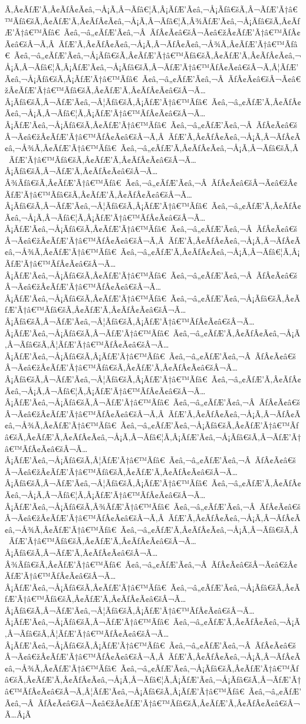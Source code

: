 \documentclass{article}
\begin{document}
\begin{outline}[enumerate]
Ã‚Â¢ÃƒÆ’Ã‚Â¢ÃƒÂ¢Ã¢â‚¬Å¡Ã‚Â¬Ãƒâ€¦Ã‚Â¡ÃƒÆ’Ã¢â‚¬Å¡Ãƒâ€šÃ‚Â¬ÃƒÆ’Ã†â€™Ãƒâ€šÃ‚Â¢ÃƒÆ’Ã‚Â¢ÃƒÂ¢Ã¢â‚¬Å¡Ã‚Â¬Ãƒâ€¦Ã‚Â¾ÃƒÆ’Ã¢â‚¬Å¡Ãƒâ€šÃ‚Â¢ÃƒÆ’Ã†â€™Ãƒâ€ Ã¢â‚¬â„¢ÃƒÆ’Ã¢â‚¬Â ÃƒÂ¢Ã¢â€šÂ¬Ã¢â€žÂ¢ÃƒÆ’Ã†â€™ÃƒÂ¢Ã¢â€šÂ¬Ã‚Â ÃƒÆ’Ã‚Â¢ÃƒÂ¢Ã¢â‚¬Å¡Ã‚Â¬ÃƒÂ¢Ã¢â‚¬Å¾Ã‚Â¢ÃƒÆ’Ã†â€™Ãƒâ€ Ã¢â‚¬â„¢ÃƒÆ’Ã¢â‚¬Å¡Ãƒâ€šÃ‚Â¢ÃƒÆ’Ã†â€™Ãƒâ€šÃ‚Â¢ÃƒÆ’Ã‚Â¢ÃƒÂ¢Ã¢â‚¬Å¡Ã‚Â¬Ãƒâ€¦Ã‚Â¡ÃƒÆ’Ã¢â‚¬Å¡Ãƒâ€šÃ‚Â¬ÃƒÆ’Ã†â€™ÃƒÂ¢Ã¢â€šÂ¬Ã‚Â¦ÃƒÆ’Ã¢â‚¬Å¡Ãƒâ€šÃ‚Â¡ÃƒÆ’Ã†â€™Ãƒâ€ Ã¢â‚¬â„¢ÃƒÆ’Ã¢â‚¬Â ÃƒÂ¢Ã¢â€šÂ¬Ã¢â€žÂ¢ÃƒÆ’Ã†â€™Ãƒâ€šÃ‚Â¢ÃƒÆ’Ã‚Â¢ÃƒÂ¢Ã¢â€šÂ¬Ã…Â¡Ãƒâ€šÃ‚Â¬ÃƒÆ’Ã¢â‚¬Â¦Ãƒâ€šÃ‚Â¡ÃƒÆ’Ã†â€™Ãƒâ€ Ã¢â‚¬â„¢ÃƒÆ’Ã‚Â¢ÃƒÂ¢Ã¢â‚¬Å¡Ã‚Â¬Ãƒâ€¦Ã‚Â¡ÃƒÆ’Ã†â€™ÃƒÂ¢Ã¢â€šÂ¬Ã…Â¡ÃƒÆ’Ã¢â‚¬Å¡Ãƒâ€šÃ‚Â¢ÃƒÆ’Ã†â€™Ãƒâ€ Ã¢â‚¬â„¢ÃƒÆ’Ã¢â‚¬Â ÃƒÂ¢Ã¢â€šÂ¬Ã¢â€žÂ¢ÃƒÆ’Ã†â€™ÃƒÂ¢Ã¢â€šÂ¬Ã‚Â ÃƒÆ’Ã‚Â¢ÃƒÂ¢Ã¢â‚¬Å¡Ã‚Â¬ÃƒÂ¢Ã¢â‚¬Å¾Ã‚Â¢ÃƒÆ’Ã†â€™Ãƒâ€ Ã¢â‚¬â„¢ÃƒÆ’Ã‚Â¢ÃƒÂ¢Ã¢â‚¬Å¡Ã‚Â¬Ãƒâ€šÃ‚Â ÃƒÆ’Ã†â€™Ãƒâ€šÃ‚Â¢ÃƒÆ’Ã‚Â¢ÃƒÂ¢Ã¢â€šÂ¬Ã…Â¡Ãƒâ€šÃ‚Â¬ÃƒÆ’Ã‚Â¢ÃƒÂ¢Ã¢â€šÂ¬Ã…Â¾Ãƒâ€šÃ‚Â¢ÃƒÆ’Ã†â€™Ãƒâ€ Ã¢â‚¬â„¢ÃƒÆ’Ã¢â‚¬Â ÃƒÂ¢Ã¢â€šÂ¬Ã¢â€žÂ¢ÃƒÆ’Ã†â€™Ãƒâ€šÃ‚Â¢ÃƒÆ’Ã‚Â¢ÃƒÂ¢Ã¢â€šÂ¬Ã…Â¡Ãƒâ€šÃ‚Â¬ÃƒÆ’Ã¢â‚¬Â¦Ãƒâ€šÃ‚Â¡ÃƒÆ’Ã†â€™Ãƒâ€ Ã¢â‚¬â„¢ÃƒÆ’Ã‚Â¢ÃƒÂ¢Ã¢â‚¬Å¡Ã‚Â¬Ãƒâ€¦Ã‚Â¡ÃƒÆ’Ã†â€™ÃƒÂ¢Ã¢â€šÂ¬Ã…Â¡ÃƒÆ’Ã¢â‚¬Å¡Ãƒâ€šÃ‚Â¢ÃƒÆ’Ã†â€™Ãƒâ€ Ã¢â‚¬â„¢ÃƒÆ’Ã¢â‚¬Â ÃƒÂ¢Ã¢â€šÂ¬Ã¢â€žÂ¢ÃƒÆ’Ã†â€™ÃƒÂ¢Ã¢â€šÂ¬Ã‚Â ÃƒÆ’Ã‚Â¢ÃƒÂ¢Ã¢â‚¬Å¡Ã‚Â¬ÃƒÂ¢Ã¢â‚¬Å¾Ã‚Â¢ÃƒÆ’Ã†â€™Ãƒâ€ Ã¢â‚¬â„¢ÃƒÆ’Ã‚Â¢ÃƒÂ¢Ã¢â‚¬Å¡Ã‚Â¬Ãƒâ€¦Ã‚Â¡ÃƒÆ’Ã†â€™ÃƒÂ¢Ã¢â€šÂ¬Ã…Â¡ÃƒÆ’Ã¢â‚¬Å¡Ãƒâ€šÃ‚Â¢ÃƒÆ’Ã†â€™Ãƒâ€ Ã¢â‚¬â„¢ÃƒÆ’Ã¢â‚¬Â ÃƒÂ¢Ã¢â€šÂ¬Ã¢â€žÂ¢ÃƒÆ’Ã†â€™ÃƒÂ¢Ã¢â€šÂ¬Ã…Â¡ÃƒÆ’Ã¢â‚¬Å¡Ãƒâ€šÃ‚Â¢ÃƒÆ’Ã†â€™Ãƒâ€ Ã¢â‚¬â„¢ÃƒÆ’Ã¢â‚¬Å¡Ãƒâ€šÃ‚Â¢ÃƒÆ’Ã†â€™Ãƒâ€šÃ‚Â¢ÃƒÆ’Ã‚Â¢ÃƒÂ¢Ã¢â€šÂ¬Ã…Â¡Ãƒâ€šÃ‚Â¬ÃƒÆ’Ã¢â‚¬Â¦Ãƒâ€šÃ‚Â¡ÃƒÆ’Ã†â€™ÃƒÂ¢Ã¢â€šÂ¬Ã…Â¡ÃƒÆ’Ã¢â‚¬Å¡Ãƒâ€šÃ‚Â¬ÃƒÆ’Ã†â€™Ãƒâ€ Ã¢â‚¬â„¢ÃƒÆ’Ã‚Â¢ÃƒÂ¢Ã¢â‚¬Å¡Ã‚Â¬Ãƒâ€šÃ‚Â¦ÃƒÆ’Ã†â€™ÃƒÂ¢Ã¢â€šÂ¬Ã…Â¡ÃƒÆ’Ã¢â‚¬Å¡Ãƒâ€šÃ‚Â¡ÃƒÆ’Ã†â€™Ãƒâ€ Ã¢â‚¬â„¢ÃƒÆ’Ã¢â‚¬Â ÃƒÂ¢Ã¢â€šÂ¬Ã¢â€žÂ¢ÃƒÆ’Ã†â€™Ãƒâ€šÃ‚Â¢ÃƒÆ’Ã‚Â¢ÃƒÂ¢Ã¢â€šÂ¬Ã…Â¡Ãƒâ€šÃ‚Â¬ÃƒÆ’Ã¢â‚¬Â¦Ãƒâ€šÃ‚Â¡ÃƒÆ’Ã†â€™Ãƒâ€ Ã¢â‚¬â„¢ÃƒÆ’Ã‚Â¢ÃƒÂ¢Ã¢â‚¬Å¡Ã‚Â¬Ãƒâ€¦Ã‚Â¡ÃƒÆ’Ã†â€™ÃƒÂ¢Ã¢â€šÂ¬Ã…Â¡ÃƒÆ’Ã¢â‚¬Å¡Ãƒâ€šÃ‚Â¬ÃƒÆ’Ã†â€™Ãƒâ€ Ã¢â‚¬â„¢ÃƒÆ’Ã¢â‚¬Â ÃƒÂ¢Ã¢â€šÂ¬Ã¢â€žÂ¢ÃƒÆ’Ã†â€™ÃƒÂ¢Ã¢â€šÂ¬Ã‚Â ÃƒÆ’Ã‚Â¢ÃƒÂ¢Ã¢â‚¬Å¡Ã‚Â¬ÃƒÂ¢Ã¢â‚¬Å¾Ã‚Â¢ÃƒÆ’Ã†â€™Ãƒâ€ Ã¢â‚¬â„¢ÃƒÆ’Ã¢â‚¬Å¡Ãƒâ€šÃ‚Â¢ÃƒÆ’Ã†â€™Ãƒâ€šÃ‚Â¢ÃƒÆ’Ã‚Â¢ÃƒÂ¢Ã¢â‚¬Å¡Ã‚Â¬Ãƒâ€¦Ã‚Â¡ÃƒÆ’Ã¢â‚¬Å¡Ãƒâ€šÃ‚Â¬ÃƒÆ’Ã†â€™ÃƒÂ¢Ã¢â€šÂ¬Ã…Â¡ÃƒÆ’Ã¢â‚¬Å¡Ãƒâ€šÃ‚Â¦ÃƒÆ’Ã†â€™Ãƒâ€ Ã¢â‚¬â„¢ÃƒÆ’Ã¢â‚¬Â ÃƒÂ¢Ã¢â€šÂ¬Ã¢â€žÂ¢ÃƒÆ’Ã†â€™Ãƒâ€šÃ‚Â¢ÃƒÆ’Ã‚Â¢ÃƒÂ¢Ã¢â€šÂ¬Ã…Â¡Ãƒâ€šÃ‚Â¬ÃƒÆ’Ã¢â‚¬Â¦Ãƒâ€šÃ‚Â¡ÃƒÆ’Ã†â€™Ãƒâ€ Ã¢â‚¬â„¢ÃƒÆ’Ã‚Â¢ÃƒÂ¢Ã¢â‚¬Å¡Ã‚Â¬Ãƒâ€¦Ã‚Â¡ÃƒÆ’Ã†â€™ÃƒÂ¢Ã¢â€šÂ¬Ã…Â¡ÃƒÆ’Ã¢â‚¬Å¡Ãƒâ€šÃ‚Â¾ÃƒÆ’Ã†â€™Ãƒâ€ Ã¢â‚¬â„¢ÃƒÆ’Ã¢â‚¬Â ÃƒÂ¢Ã¢â€šÂ¬Ã¢â€žÂ¢ÃƒÆ’Ã†â€™ÃƒÂ¢Ã¢â€šÂ¬Ã‚Â ÃƒÆ’Ã‚Â¢ÃƒÂ¢Ã¢â‚¬Å¡Ã‚Â¬ÃƒÂ¢Ã¢â‚¬Å¾Ã‚Â¢ÃƒÆ’Ã†â€™Ãƒâ€ Ã¢â‚¬â„¢ÃƒÆ’Ã‚Â¢ÃƒÂ¢Ã¢â‚¬Å¡Ã‚Â¬Ãƒâ€šÃ‚Â ÃƒÆ’Ã†â€™Ãƒâ€šÃ‚Â¢ÃƒÆ’Ã‚Â¢ÃƒÂ¢Ã¢â€šÂ¬Ã…Â¡Ãƒâ€šÃ‚Â¬ÃƒÆ’Ã‚Â¢ÃƒÂ¢Ã¢â€šÂ¬Ã…Â¾Ãƒâ€šÃ‚Â¢ÃƒÆ’Ã†â€™Ãƒâ€ Ã¢â‚¬â„¢ÃƒÆ’Ã¢â‚¬Â ÃƒÂ¢Ã¢â€šÂ¬Ã¢â€žÂ¢ÃƒÆ’Ã†â€™ÃƒÂ¢Ã¢â€šÂ¬Ã…Â¡ÃƒÆ’Ã¢â‚¬Å¡Ãƒâ€šÃ‚Â¢ÃƒÆ’Ã†â€™Ãƒâ€ Ã¢â‚¬â„¢ÃƒÆ’Ã¢â‚¬Å¡Ãƒâ€šÃ‚Â¢ÃƒÆ’Ã†â€™Ãƒâ€šÃ‚Â¢ÃƒÆ’Ã‚Â¢ÃƒÂ¢Ã¢â€šÂ¬Ã…Â¡Ãƒâ€šÃ‚Â¬ÃƒÆ’Ã¢â‚¬Â¦Ãƒâ€šÃ‚Â¡ÃƒÆ’Ã†â€™ÃƒÂ¢Ã¢â€šÂ¬Ã…Â¡ÃƒÆ’Ã¢â‚¬Å¡Ãƒâ€šÃ‚Â¬ÃƒÆ’Ã†â€™Ãƒâ€ Ã¢â‚¬â„¢ÃƒÆ’Ã‚Â¢ÃƒÂ¢Ã¢â‚¬Å¡Ã‚Â¬Ãƒâ€šÃ‚Â¦ÃƒÆ’Ã†â€™ÃƒÂ¢Ã¢â€šÂ¬Ã…Â¡ÃƒÆ’Ã¢â‚¬Å¡Ãƒâ€šÃ‚Â¡ÃƒÆ’Ã†â€™Ãƒâ€ Ã¢â‚¬â„¢ÃƒÆ’Ã¢â‚¬Â ÃƒÂ¢Ã¢â€šÂ¬Ã¢â€žÂ¢ÃƒÆ’Ã†â€™ÃƒÂ¢Ã¢â€šÂ¬Ã‚Â ÃƒÆ’Ã‚Â¢ÃƒÂ¢Ã¢â‚¬Å¡Ã‚Â¬ÃƒÂ¢Ã¢â‚¬Å¾Ã‚Â¢ÃƒÆ’Ã†â€™Ãƒâ€ Ã¢â‚¬â„¢ÃƒÆ’Ã¢â‚¬Å¡Ãƒâ€šÃ‚Â¢ÃƒÆ’Ã†â€™Ãƒâ€šÃ‚Â¢ÃƒÆ’Ã‚Â¢ÃƒÂ¢Ã¢â‚¬Å¡Ã‚Â¬Ãƒâ€¦Ã‚Â¡ÃƒÆ’Ã¢â‚¬Å¡Ãƒâ€šÃ‚Â¬ÃƒÆ’Ã†â€™ÃƒÂ¢Ã¢â€šÂ¬Ã‚Â¦ÃƒÆ’Ã¢â‚¬Å¡Ãƒâ€šÃ‚Â¡ÃƒÆ’Ã†â€™Ãƒâ€ Ã¢â‚¬â„¢ÃƒÆ’Ã¢â‚¬Â ÃƒÂ¢Ã¢â€šÂ¬Ã¢â€žÂ¢ÃƒÆ’Ã†â€™Ãƒâ€šÃ‚Â¢ÃƒÆ’Ã‚Â¢ÃƒÂ¢Ã¢â€šÂ¬Ã…Â¡Ã
\end{outline}
\end{document}
